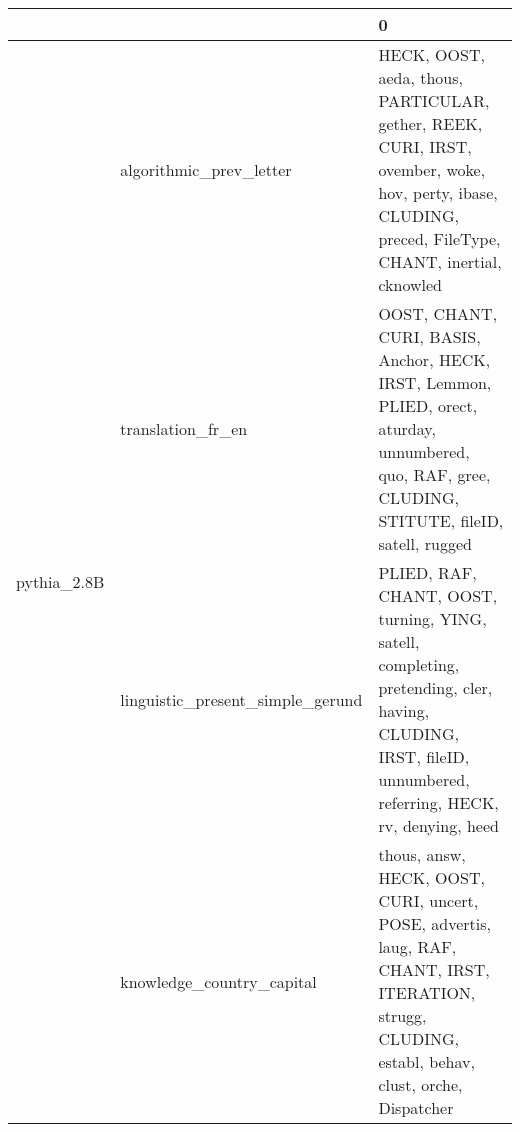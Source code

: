 \begin{tabular}{lll}
\toprule
 &  & 0 \\
\midrule
\multirow[t]{4}{*}{pythia_2.8B} & algorithmic_prev_letter & HECK, OOST, aeda, thous, PARTICULAR, gether, REEK, CURI, IRST, ovember, woke, hov, perty, ibase, CLUDING, preced, FileType, CHANT, inertial, cknowled \\
 & translation_fr_en & OOST, CHANT, CURI, BASIS, Anchor, HECK, IRST, Lemmon, PLIED, orect, aturday, unnumbered, quo, RAF, gree, CLUDING, STITUTE, fileID, satell, rugged \\
 & linguistic_present_simple_gerund & PLIED, RAF, CHANT, OOST, turning, YING, satell, completing, pretending, cler, having, CLUDING, IRST, fileID, unnumbered, referring, HECK, rv, denying, heed \\
 & knowledge_country_capital & thous, answ, HECK, OOST, CURI, uncert, POSE, advertis, laug, RAF, CHANT, IRST, ITERATION, strugg, CLUDING, establ, behav, clust, orche, Dispatcher \\
\cline{1-3}
\bottomrule
\end{tabular}
